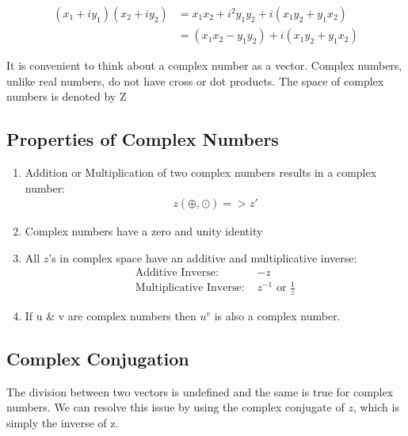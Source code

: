 \documentclass[12pt]{article}
\begin{document}
\begin{equation}
\begin{aligned}
  (x_1+iy_1)(x_2+iy_2) &= x_1 x_2 + i^2 y_1 y_2 + i(x_1 y_2 + y_1 x_2) \\
  &= (x_1 x_2 - y_1 y_2)+ i(x_1 y_2 + y_1 x_2)
\end{aligned}
\end{equation}

It is convenient to think about a complex number as a vector. Complex numbers, unlike real numbers, do not have cross or dot products. The space of complex numbers is denoted by Z


\subsection{Properties of Complex Numbers}
\begin{enumerate}
\item
Addition or Multiplication of two complex numbers results in a complex number:
\begin{equation}
\begin{aligned}
	z(\oplus , \odot) => z'
\end{aligned}
\end{equation}

\item
	Complex numbers have a zero and unity identity

\item All $z$'s in complex space have an additive and multiplicative inverse:
\begin{equation}
    \begin{aligned}
        \text{Additive Inverse: } & -z \\
        \text{Multiplicative Inverse: } & z^{-1} \text{ or } \frac{1}{z}
    \end{aligned}
\end{equation}

\item If u \& v are complex numbers then $u^v$ is also a complex number.
\end{enumerate}

\subsection{Complex Conjugation}
The division between two vectors is undefined and the same is true for complex numbers. We can resolve this issue by using the complex conjugate of $z$, which is simply the inverse of z.
\end{document}
